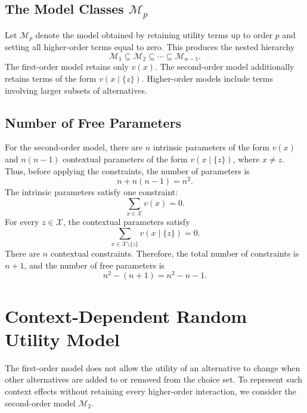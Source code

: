 \documentclass[12pt,oneside]{report}
\newcommand{\X}{\mathcal{X}}
\begin{document}
\subsection{The Model Classes $\mathcal{M}_p$}
Let $\mathcal{M}_p$ denote the model obtained by retaining utility terms up to
order $p$ and setting all higher-order terms equal to zero. This produces the
nested hierarchy
\begin{equation}
    \mathcal{M}_1
    \subseteq
    \mathcal{M}_2
    \subseteq
    \cdots
    \subseteq
    \mathcal{M}_{n-1}.
\end{equation}
The first-order model retains only $v(x)$. The second-order model additionally
retains terms of the form $v(x\mid\{z\})$. Higher-order models include terms
involving larger subsets of alternatives.
\subsection{Number of Free Parameters}
For the second-order model, there are $n$ intrinsic parameters of the form
$v(x)$ and $n(n-1)$ contextual parameters of the form
$v(x\mid\{z\})$, where $x\neq z$. Thus, before applying the constraints,
the number of parameters is
\begin{equation}
    n+n(n-1)=n^2.
\end{equation}
The intrinsic parameters satisfy one constraint:
\begin{equation}
    \sum_{x\in\X}v(x)=0.
\end{equation}
For every $z\in\X$, the contextual parameters satisfy
\begin{equation}
    \sum_{x\in\X\setminus\{z\}}v(x\mid\{z\})=0.
\end{equation}
There are $n$ contextual constraints. Therefore, the total number of
constraints is $n+1$, and the number of free parameters is
\begin{equation}
    n^2-(n+1)=n^2-n-1.
    \label{eq:second-order-parameter-count}
\end{equation}

\section{Context-Dependent Random Utility Model}
The first-order model does not allow the utility of an alternative to change
when other alternatives are added to or removed from the choice set. To
represent such context effects without retaining every higher-order
interaction, we consider the second-order model $\mathcal{M}_2$.
\end{document}
